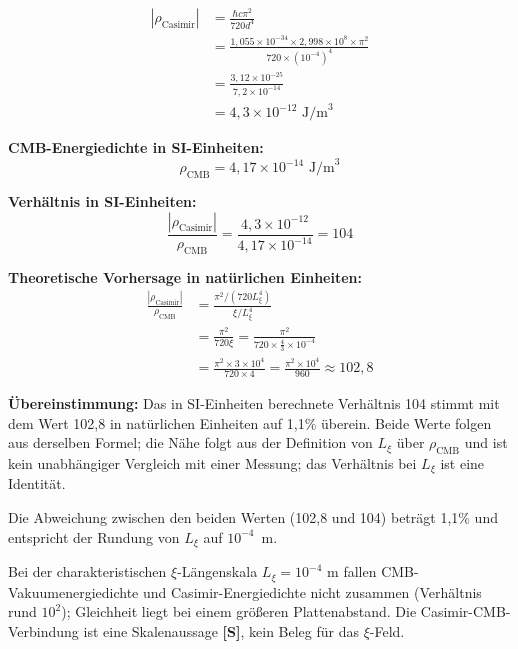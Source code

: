 	\begin{align}
		|\rho_{\text{Casimir}}| &= \frac{\hbar c \pi^2}{720 d^4} \\
		&= \frac{1,055 \times 10^{-34} \times 2,998 \times 10^8 \times \pi^2}{720 \times (10^{-4})^4} \\
		&= \frac{3,12 \times 10^{-25}}{7,2 \times 10^{-14}} \\
		&= 4,3 \times 10^{-12} \text{ J/m}^3
	\end{align}
	
	\textbf{CMB-Energiedichte in SI-Einheiten:}
	\begin{equation}
		\rho_{\text{CMB}} = 4,17 \times 10^{-14} \text{ J/m}^3
	\end{equation}
	
	\textbf{Verhältnis in SI-Einheiten:}
	\begin{equation}
		\frac{|\rho_{\text{Casimir}}|}{\rho_{\text{CMB}}} = \frac{4,3 \times 10^{-12}}{4,17 \times 10^{-14}} = 104
	\end{equation}
	
	\textbf{Theoretische Vorhersage in natürlichen Einheiten:}
	\begin{align}
		\frac{|\rho_{\text{Casimir}}|}{\rho_{\text{CMB}}} &= \frac{\pi^2 / (720 L_\xi^4)}{\xi / L_\xi^4} \\
		&= \frac{\pi^2}{720 \xi} = \frac{\pi^2}{720 \times \frac{4}{3} \times 10^{-4}} \\
		&= \frac{\pi^2 \times 3 \times 10^4}{720 \times 4} = \frac{\pi^2 \times 10^4}{960} \approx 102,8
	\end{align}
	
	\textbf{Übereinstimmung:} Das in SI-Einheiten berechnete Verhältnis 104 stimmt mit dem Wert 102,8 in natürlichen Einheiten auf 1,1\% überein. Beide Werte folgen aus derselben Formel; die Nähe folgt aus der Definition von $L_\xi$ über $\rho_{\text{CMB}}$ und ist kein unabhängiger Vergleich mit einer Messung; das Verhältnis bei $L_\xi$ ist eine Identität.
	
	Die Abweichung zwischen den beiden Werten (102,8 und 104) beträgt 1,1\% und entspricht der Rundung von $L_\xi$ auf $10^{-4}$~m.
	
	\begin{important}
		Bei der charakteristischen $\xi$-Längenskala $L_\xi = 10^{-4}$ m fallen CMB-Vakuumenergiedichte und Casimir-Energiedichte nicht zusammen (Verhältnis rund $10^2$); Gleichheit liegt bei einem größeren Plattenabstand. Die Casimir-CMB-Verbindung ist eine Skalenaussage \textbf{[S]}, kein Beleg für das $\xi$-Feld.
	\end{important}
	
